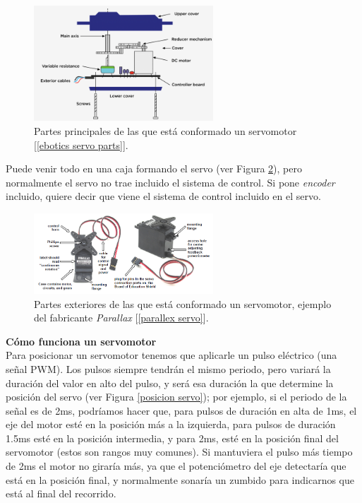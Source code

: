 \documentclass[12pt]{article}
\begin{document}
	\begin{figure}[h]
		\begin{center}
			\includegraphics[width=0.6\textwidth]{img/servo_parts.png}
			\caption{Partes principales de las que está conformado un servomotor [\ref{ebotics servo parts}].}
			\label{servo parts}
		\end{center}
	\end{figure}

	\pagebreak

	\noindent Puede venir todo en una caja formando el servo (ver Figura \ref{parallex labels parts}), pero normalmente el servo no trae incluido el sistema de control. Si pone \textit{encoder} incluido, quiere decir que viene el sistema de control incluido en el servo. \\
	
	\begin{figure}[h]
		\begin{center}
			\includegraphics[width=0.6\textwidth]{img/servo_labels.png}
			\caption{Partes exteriores de las que está conformado un servomotor, ejemplo del fabricante \textit{Parallax} [\ref{parallex servo}].}
			\label{parallex labels parts}
		\end{center}
	\end{figure}

	\noindent \textbf{Cómo funciona un servomotor}\\
	
	\noindent Para posicionar un servomotor tenemos que aplicarle un pulso eléctrico (una señal PWM). Los pulsos siempre tendrán el mismo periodo, pero variará la duración del valor en alto del pulso, y será esa duración la que determine la posición del servo (ver Figura \ref{posicion servo}); por ejemplo, si el periodo de la señal es de 2ms, podríamos hacer que, para pulsos de duración en alta de 1ms, el eje del motor esté en la posición más a la izquierda, para pulsos de duración 1.5ms esté en la posición intermedia, y para 2ms, esté en la posición final del servomotor (estos son rangos muy comunes). Si mantuviera el pulso más tiempo de 2ms el motor no giraría más, ya que el potenciómetro del eje detectaría que está en la posición final, y normalmente sonaría un zumbido para indicarnos que está al final del recorrido. \\
	
\end{document}

